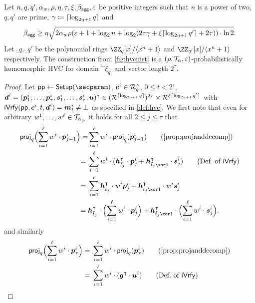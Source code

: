 \begin{lemma}\label{lem:hvcprobhom}
  Let $n,q,q',\alpha_w,\rho,\eta,\tau,\xi,\beta_{\mathsf{agg}},\varepsilon$ be positive integers such that $n$ is a power of two, $q,q'$ are prime, $\gamma\coloneqq \lceil\log_{2\eta+1}q\rceil$
  and \[\beta_{\mathsf{agg}} \geq \eta\sqrt{2\alpha_w\rho(\varepsilon+1+\log_2 n + \log_2(2\tau \gamma + \xi\lceil\log_{2\eta+1}q'\rceil + 2\tau))\cdot\ln2}.\]
  Let $\ring_q,\ring_{q'}$ be the polynomial rings $\ZZ_q[x]/\langle x^n+1\rangle$ and $\ZZ_{q'}[x]/\langle x^n+1\rangle$ respectively.
  The construction from \autoref{fig:hvcinst} is a $(\rho,\mathcal{T}_\alpha,\varepsilon)$-probabilistically homomorphic HVC for domain $\ring^\xi_{q'}$ and vector length $2^\tau$.
\end{lemma}
\begin{proof}
Let $\params \gets \setup(\secparam)$, $\boldsymbol{c}^i \in \mathcal{R}_q^\gamma$, $0 \leq t < 2^\tau$, $\boldsymbol{d}^i = (\boldsymbol{p}^i_1,\dots,\boldsymbol{p}^i_{\tau},\boldsymbol{s}^i_1, \dots, \boldsymbol{s}^i_{\tau},\boldsymbol{u})^\intercal\in (\mathcal{R}^{\lceil\log_{2\eta+1} q\rceil})^{2\tau} \times \mathcal{R}^{\xi\lceil\log_{2\eta+1} q'\rceil}$ with $\mathsf{iVrfy}(\mathsf{pp},\boldsymbol{c}^i,t,\boldsymbol{d}^i) = \boldsymbol{m}_t^i \neq \bot$
as specified in \autoref{def:hvc}.
%
We first note that even for arbitrary $w^1,\dots,w^{\ell}\in\mathcal{T}_{\alpha_w}$ it holds for all $2\leq j\leq \tau$ that
\begin{align*}
  \projmod{q}\Bigl(\sum_{i=1}^{\ell}w^i\cdot\vec{p}_{j-1}^i\Bigr) = &\sum_{i=1}^{\ell}w^i\cdot\projmod{q}(\vec{p}_{j-1}^i)\tag{\autoref{prop:projanddecomp}}\\
  ={}&\sum_{i=1}^{\ell}w^i\cdot(\vec{h}_{\tilde t_j}^\transpose\cdot \vec{p}^i_{j} + \vec{h}_{\tilde t_j\xor 1}^\transpose \cdot \vec{s}^i_{j})\tag{Def.\ of $\iverify$}\\
  ={}&\sum_{i=1}^{\ell}\vec{h}_{\tilde t_j}^\transpose\cdot w^i \vec{p}^i_{j} + \vec{h}_{\tilde t_j\xor 1}^\transpose\cdot w^i  \vec{s}^i_{j}\\  
  ={}& \vec{h}_{\tilde t_j}^\transpose\cdot \Bigl(\sum_{i=1}^{\ell}w^i\cdot\vec{p}^i_{j}\Bigr) + \vec{h}_{\tilde t_j \xor 1}^\transpose \cdot \Bigl(\sum_{i=1}^{\ell}w^i\cdot\vec{s}^i_{j}\Bigr).
\end{align*}
and similarly
\begin{align*}
  \projmod{q}\Bigl(\sum_{i=1}^{\ell}w^i\cdot\vec{p}_{\tau}^i\Bigr) ={}&\sum_{i=1}^{\ell}w^i\cdot\projmod{q}(\vec{p}_{\tau}^i)\tag{\autoref{prop:projanddecomp}}\\
  ={}&\sum_{i=1}^{\ell}w^i\cdot(\vec{g}^\transpose\cdot \vec{u}^i)\tag{Def.\ of $\iverify$}\\

\end{align*}
\end{proof}
